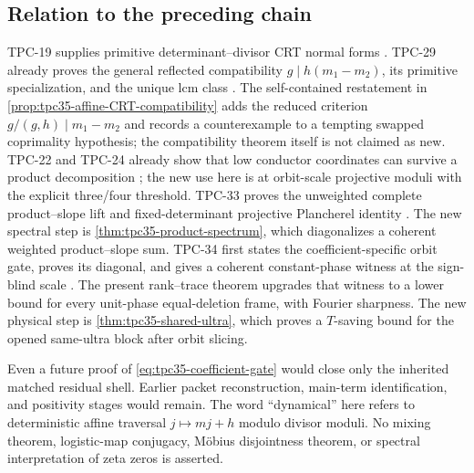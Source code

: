 \subsection{Relation to the preceding chain}

TPC-19 supplies primitive determinant--divisor CRT normal forms
\citep{WangTPC19}.  TPC-29 already proves the general reflected
compatibility \(g\mid h(m_1-m_2)\), its primitive specialization, and the
unique lcm class \citep{WangTPC29}.  The self-contained restatement in
\cref{prop:tpc35-affine-CRT-compatibility} adds the reduced criterion
\(g/(g,h)\mid m_1-m_2\) and records a counterexample to a tempting swapped
coprimality hypothesis; the compatibility theorem itself is not claimed
as new.  TPC-22 and TPC-24 already show that low conductor
coordinates can survive a product decomposition
\citep{WangTPC22,WangTPC24}; the new use here is at orbit-scale projective
moduli with the explicit three/four threshold.  TPC-33 proves the
unweighted complete product--slope lift and fixed-determinant projective
Plancherel identity \citep{WangTPC33}.  The new spectral step is
\cref{thm:tpc35-product-spectrum}, which diagonalizes a coherent weighted
product--slope sum.  TPC-34 first states the coefficient-specific orbit
gate, proves its diagonal, and gives a coherent constant-phase witness at
the sign-blind scale \citep{WangTPC34}.  The present rank--trace theorem
upgrades that witness to a lower bound for every unit-phase
equal-deletion frame, with Fourier sharpness.  The new physical step is
\cref{thm:tpc35-shared-ultra}, which proves a \(T\)-saving bound for the
opened same-ultra block after orbit slicing.

Even a future proof of \eqref{eq:tpc35-coefficient-gate} would close only
the inherited matched residual shell.  Earlier packet reconstruction,
main-term identification, and positivity stages would remain.  The word
``dynamical'' here refers to deterministic affine traversal
\(j\mapsto mj+h\) modulo divisor moduli.  No mixing theorem, logistic-map
conjugacy, M\"obius disjointness theorem, or spectral interpretation of
zeta zeros is asserted.
